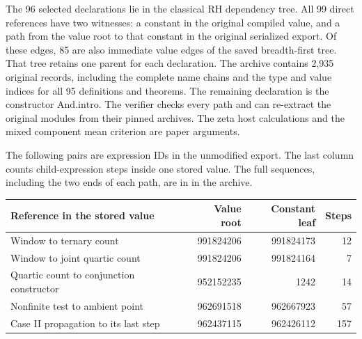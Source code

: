 The 96 selected declarations lie in the classical RH dependency tree.
All 99 direct references have two witnesses: a constant in the original
compiled value, and a path from the value root to that constant in the
original serialized export. Of these edges, 85 are also immediate
value edges of the saved breadth-first tree. That tree retains one
parent for each declaration. The archive contains 2,935 original
records, including the complete name chains and the type and value
indices for all 95 definitions and theorems. The remaining declaration
is the constructor \(\mathrm{And.intro}\). The verifier checks every
path and can re-extract the original modules from their pinned
archives. The zeta host calculations and the mixed component mean
criterion are paper arguments.

The following pairs are expression IDs in the unmodified export.
The last column counts child-expression steps inside one stored
value. The full sequences, including the two ends of each path,
are in  in the archive.
\begin{center}\small
\begin{tabular}{@{}lrrr@{}}
\toprule
Reference in the stored value & Value root & Constant leaf & Steps\\
\midrule
Window to ternary count                 & 991824206 & 991824173 & 12\\
Window to joint quartic count           & 991824206 & 991824164 & 7\\
Quartic count to conjunction constructor & 952152235 & 1242      & 14\\
Nonfinite test to ambient point         & 962691518 & 962667923 & 57\\
Case II propagation to its last step    & 962437115 & 962426112 & 157\\
\bottomrule
\end{tabular}
\end{center}
